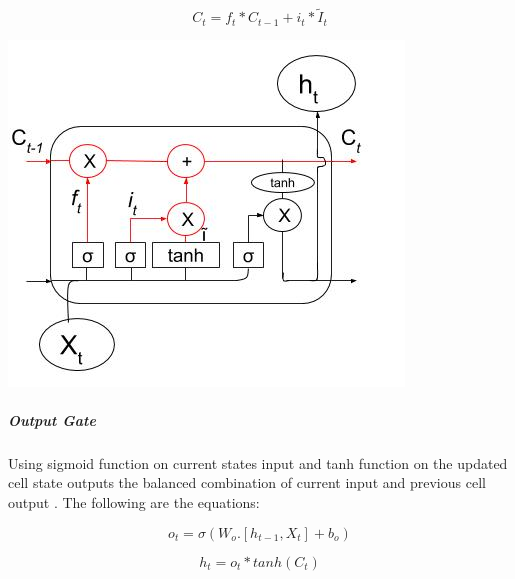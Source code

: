 \begin{equation}
		C_{t} = f_{t} * C_{t-1} + i_{t} * \tilde{I}_{t}
\end{equation}

				\begin{center}
				\includegraphics[width=\linewidth]{figures/update-to-new-cell-state.jpg}	
				\label{fig: Update to new cell state}
				\end{center}


\subparagraph{Output Gate}

Using sigmoid function on current states input and tanh function on the updated cell state outputs the balanced combination of current input and previous cell output . The following are the equations:

\begin{equation}
	o_{t} = \sigma (W_{o} . [h_{t-1}, X_{t}] + b_{o})
\end{equation}

\begin{equation}
	h_{t}  = o_{t} * tanh( C_{t} )
\end{equation}

